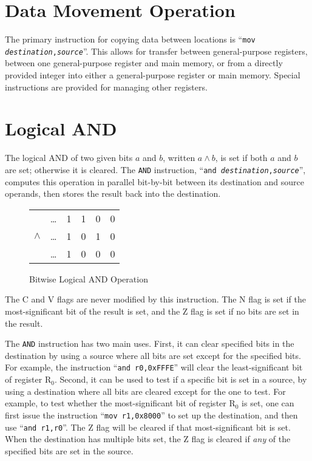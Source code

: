 \documentclass[12pt,english]{book}
\begin{document}
\section{Data Movement Operation}
The primary instruction for copying data between locations
is ``\texttt{mov \textit{destination},\textit{source}}''.
This allows for transfer between general-purpose registers,
between one general-purpose register and main memory,
or from a directly provided integer
into either a general-purpose register or main memory.
Special instructions are provided for managing other registers.

\section{Logical AND}
The logical AND of two given bits \(a\) and \(b\),
written \(a\wedge b\),
is set if both \(a\) and \(b\) are set;
otherwise it is cleared.
The \texttt{AND} instruction,
``\texttt{and \textit{destination},\textit{source}}'',
computes this operation in parallel
bit-by-bit between its destination and source operands,
then stores the result back into the destination.

\begin{figure}[ht!]\centering
  \begin{tabular}{cccccc}
              &\dots&1&1&0&0\\
    \(\wedge\)&\dots&1&0&1&0\\\cline{2-6}
              &\dots&1&0&0&0
  \end{tabular}
  \caption{Bitwise Logical AND Operation}
  \label{fig:and}
\end{figure}

The C and V flags are never modified by this instruction.
The N flag is set if the most-significant bit of the result is set,
and the Z flag is set if no bits are set in the result.

The \texttt{AND} instruction has two main uses.
First, it can clear specified bits in the destination
by using a source where all bits are set
except for the specified bits.
For example, the instruction ``\texttt{and r0,0xFFFE}''
will clear the least-significant bit of register \(\text{R}_0\).
Second, it can be used to test if a specific bit is set in a source,
by using a destination where all bits are cleared
except for the one to test.
For example, to test whether the most-significant bit
of register \(\text{R}_0\) is set,
one can first issue the instruction
``\texttt{mov r1,0x8000}'' to set up the destination,
and then use ``\texttt{and r1,r0}''.
The Z flag will be cleared if that most-significant bit is set.
When the destination has multiple bits set,
the Z flag is cleared if \emph{any} of the specified bits
are set in the source.
\end{document}
